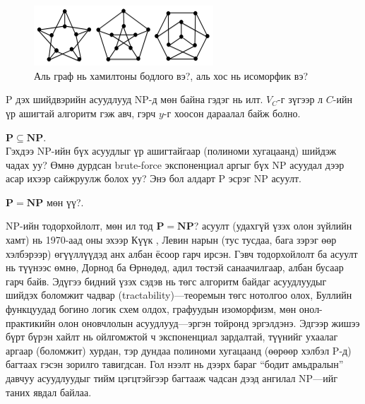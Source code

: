 \begin{figure}[h]
  \centering
  \includegraphics[width=0.6\textwidth]{figs/5.png}
  \caption{Аль граф нь хамилтоны бодлого вэ?, аль хос нь исоморфик вэ?}
  \label{fig:3-2}
\end{figure}


P дэх шийдвэрийн асуудлууд NP-д мөн байна гэдэг нь илт. $V_C$-г зүгээр л $C$-ийн үр ашигтай алгоритм гэж авч, гэрч $y$-г хоосон дараалал байж болно.


\begin{corollary}
$\mathbf{P} \subseteq \mathbf{NP}.$\\
Гэхдээ NP-ийн бүх асуудлыг үр ашигтайгаар (полиноми хугацаанд) шийдэж чадах уу? Өмнө дурдсан brute-force экспоненциал аргыг бүх NP асуудал дээр асар ихээр сайжруулж болох уу? Энэ бол алдарт P эсрэг NP асуулт.
\end{corollary}


\begin{openProblem}
$\mathbf{P} = \mathbf{NP}$ мөн үү?.
\end{openProblem}


NP-ийн тодорхойлолт, мөн ил тод $\mathbf{P} = \mathbf{NP}$? асуулт (удахгүй үзэх олон зүйлийн хамт) нь 1970-аад оны эхээр Күүк \cite{Coo71}, Левин \cite{Lev73} нарын (тус тусдаа, бага зэрэг өөр хэлбэрээр) өгүүллүүдэд анх албан ёсоор гарч ирсэн. Гэвч тодорхойлолт ба асуулт нь түүнээс өмнө, Дорнод ба Өрнөдөд, адил төстэй санаачилгаар, албан бусаар гарч байв. Эдүгээ бидний үзэх сэдэв нь төгс алгоритм байдаг асуудлуудыг шийдэх боломжит чадвар (trac­tability)—теоремын төгс нотолгоо олох, Буллийн функцуудад богино логик схем олдох, графуудын изоморфизм, мөн онол-практикийн олон оновчлолын асуудлууд—эргэн тойронд эргэлдэнэ. Эдгээр жишээ бүрт бүрэн хайлт нь ойлгомжтой ч экспоненциал зардалтай, түүнийг ухаалаг аргаар (боломжит) хурдан, тэр дундаа полиноми хугацаанд (өөрөөр хэлбэл P-д) багтаах гэсэн зорилго тавигдсан. Гол нээлт нь дээрх бараг “бодит амьдралын” давчуу асуудлуудыг тийм цэгцтэйгээр багтааж чадсан дээд ангилал NP—ийг таних явдал байлаа.


